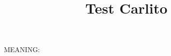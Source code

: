 \documentclass{scrartcl}
\title{Test Carlito}
\begin{document}
MEANING: \meaning\@author
\end{document}
